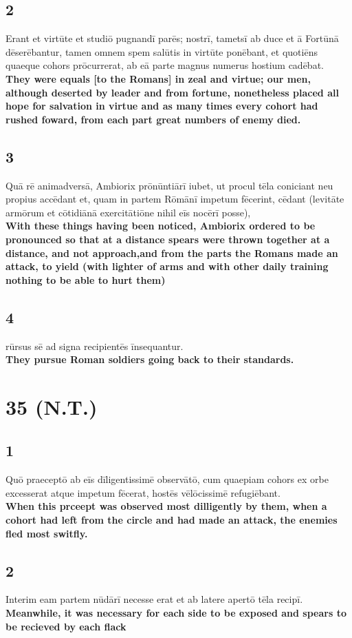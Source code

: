 \documentclass{article}
\begin{document}
\subsection*{2}
Erant et virtūte et studiō pugnandī parēs; nostrī, tametsī ab duce et ā Fortūnā dēserēbantur, tamen omnem spem salūtis in virtūte ponēbant, et quotiēns quaeque cohors prōcurrerat, ab eā parte magnus numerus hostium cadēbat.  \\ 
\textbf{They were equals [to the Romans] in zeal and virtue; our men, although deserted by leader and from fortune, nonetheless placed all hope for salvation in virtue and as many times every cohort had rushed foward, from each part great numbers of enemy died.}
\subsection*{3}
Quā rē animadversā, Ambiorix prōnūntiārī iubet, ut procul tēla coniciant neu propius accēdant et, quam in partem Rōmānī impetum fēcerint, cēdant (levitāte armōrum et cōtidiānā exercitātiōne nihil eīs nocērī posse), \\ 
\textbf{With these things having been noticed, Ambiorix ordered to be pronounced so that at a distance spears were thrown together at a distance, and not approach,and from the parts the Romans made an attack, to yield (with lighter of arms and with other daily training nothing to be able to hurt them)}
\subsection*{4}
rūrsus sē ad signa recipientēs īnsequantur. \\ 
\textbf{They pursue Roman soldiers going back to their standards.}

\section*{35 (N.T.)}
\subsection*{1}
Quō praeceptō ab eīs dīligentissimē observātō, cum quaepiam cohors ex orbe excesserat atque impetum fēcerat, hostēs vēlōcissimē refugiēbant.\\
\textbf{When this prceept was observed most dilligently by them, when a cohort had left from the circle and had made an attack, the enemies fled most switfly.}

\subsection*{2}
Interim eam partem nūdārī necesse erat et ab latere apertō tēla recipī.\\
\textbf{Meanwhile, it was necessary for each side to be exposed and spears to be recieved by each flack}
\end{document}
